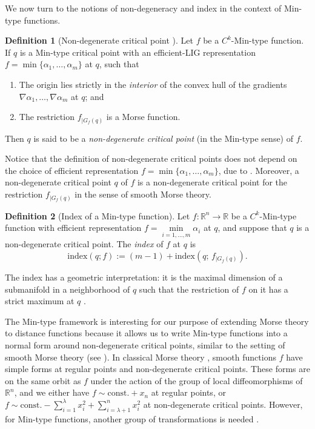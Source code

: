 \documentclass[11pt]{article}
\newcommand{\R}{\mathbb{R}}
\newcommand{\idx}{\mathrm{index}}
\newcommand{\grad}{\nabla}
\theoremstyle{plain}
\theoremstyle{definition}
\newtheorem{defi}{Definition}
\theoremstyle{remark}
\begin{document}
	We now turn to the notions of non-degeneracy and index in the context of Min-type functions. 
	
	\begin{defi}[Non-degenerate critical point \citep{gershkovich_morse_1997}]
		\label{def:non_degen_crit}
		Let $f$ be a $C^k$-Min-type function. If $q$ is a Min-type critical point with an efficient-LIG representation $f = \min \{ \alpha_1, \ldots, \alpha_m\}$ at $q$, such that 
		\begin{enumerate}
			\item The origin lies strictly in the \emph{interior} of the convex hull of the gradients $\grad \alpha_1, \ldots, \grad \alpha_m$ at $q$; and
			\item The restriction $f_{|G_f(q)}$ is a Morse function.
		\end{enumerate}
		Then $q$ is said to be a \emph{non-degenerate critical point} (in the Min-type sense) of $f$. 
	\end{defi}
	
	Notice that the definition of non-degenerate critical points does not depend on the choice of efficient representation $f = \min \{ \alpha_1, \ldots, \alpha_m\}$, due to .
	Moreover, a non-degenerate critical point $q$ of $f$ is a non-degenerate critical point for the restriction $f_{|G_f(q)}$ in the sense of smooth Morse theory.
	
	\begin{defi}[Index of a Min-type function]
		\label{def:index_min_type}
		Let $f : \R^n \to \R$ be a $C^k$-Min-type function with efficient representation $f = \min\limits_{i = 1,\ldots,m} \alpha_i$ at $q$,
		and suppose that $q$ is a non-degenerate critical point. The \emph{index} of $f$ at $q$ is
		\[ \idx(q;f) := (m-1) + \idx(q;\, f_{|G_f(q)}).\]
	\end{defi}
	The index has a geometric interpretation: it is the maximal dimension of a submanifold in a neighborhood of $q$ such that the restriction of $f$ on it has a strict maximum at $q$ \cite[Section 3.1, Proposition 3]{gershkovich_morse_1997}.
	
	The Min-type framework is interesting for our purpose of extending Morse theory to distance functions because it allows us to write Min-type functions into a normal form around non-degenerate critical points, similar to the setting of smooth Morse theory (see ).
	In classical Morse theory \citep{milnor_morse_1963}, smooth functions $f$ have simple forms at regular points and non-degenerate critical points. 
	These forms are on the same orbit as $f$ under the action of the group of local diffeomorphisms of $\R^n$, and we either have $f \sim \mathrm{const.} + x_n$ at regular points, or $f \sim \mathrm{const.} - \sum_{i = 1}^{\lambda} x_i^2 + \sum_{i = \lambda + 1}^{n} x_i^2$ at non-degenerate critical points. However, for Min-type functions, another group of transformations is needed \citep{matov_singularities_1986, gershkovich_singularity_1997}.
	
\end{document}
